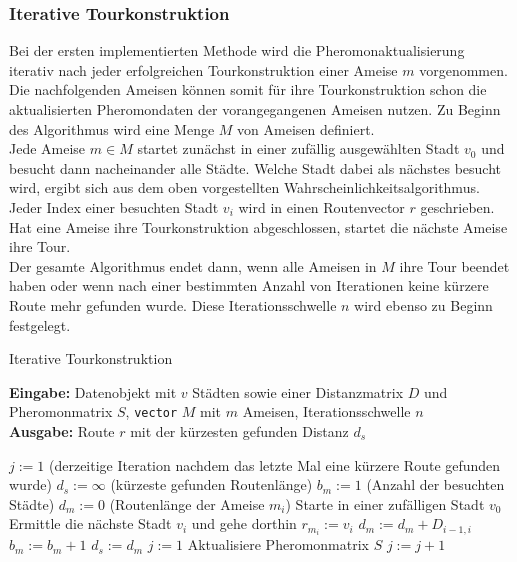 \documentclass[doktyp=barbeit, sprache=german]{TUBAFarbeiten}
\begin{document}
\subsubsection{Iterative Tourkonstruktion}
Bei der ersten implementierten Methode wird die Pheromonaktualisierung iterativ nach jeder erfolgreichen Tourkonstruktion einer Ameise $m$ vorgenommen. Die nachfolgenden Ameisen können somit für ihre Tourkonstruktion schon die aktualisierten Pheromondaten der vorangegangenen Ameisen nutzen. Zu Beginn des Algorithmus wird eine Menge $M$ von Ameisen definiert. \\Jede Ameise $m \in M$ startet zunächst in einer zufällig ausgewählten Stadt $v_0$ und besucht dann nacheinander alle Städte. Welche Stadt dabei als nächstes besucht wird, ergibt sich aus dem oben vorgestellten Wahrscheinlichkeitsalgorithmus. Jeder Index einer besuchten Stadt $v_i$ wird in einen Routenvector $r$ geschrieben. Hat eine Ameise ihre Tourkonstruktion abgeschlossen, startet die nächste Ameise ihre Tour. \\Der gesamte Algorithmus endet dann, wenn alle Ameisen in $M$ ihre Tour beendet haben oder wenn nach einer bestimmten Anzahl von Iterationen keine kürzere Route mehr gefunden wurde. Diese Iterationsschwelle $n$ wird ebenso zu Beginn festgelegt.
\begin{algorithm}
\caption{Iterative Tourkonstruktion}
\label{IterativeTour}
\textbf{Eingabe:} Datenobjekt mit $v$ Städten sowie einer Distanzmatrix $D$ und Pheromonmatrix $S$, \texttt{vector} $M$ mit $m$ Ameisen, Iterationsschwelle $n$
\\\textbf{Ausgabe:} Route $r$ mit der kürzesten gefunden Distanz $d_s$
\begin{algorithmic}[1]
\State $j := 1$ (derzeitige Iteration nachdem das letzte Mal eine kürzere Route gefunden wurde)
\State $d_s := \infty$ (kürzeste gefunden Routenlänge)
\State $b_m := 1$ (Anzahl der besuchten Städte)
\State $d_m := 0$ (Routenlänge der Ameise $m_i$)
\State Starte in einer zufälligen Stadt $v_0$
\State Ermittle die nächste Stadt $v_i$ und gehe dorthin
\State $r_{m_i} := v_i$
\State $d_m := d_m + D_{i-1,i}$
\State $b_m := b_m + 1$
\EndWhile
{}
\State $d_s := d_m$
\State $j := 1$
\EndIf
\State Aktualisiere Pheromonmatrix $S$
\State $j := j + 1$
\EndIf
\EndFor
\end{algorithmic}
\end{algorithm}
\end{document}
